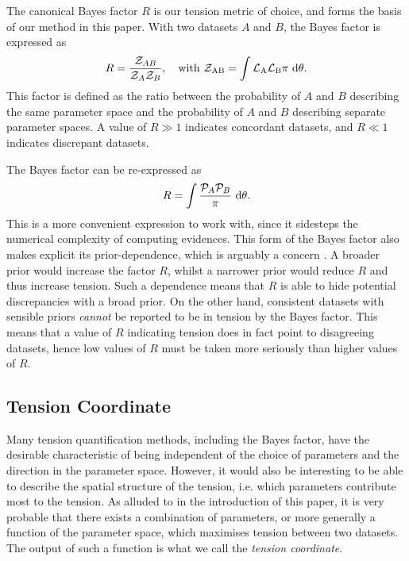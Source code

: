 \documentclass[%
 reprint,
 amsmath,amssymb,
 aps,
]{revtex4-2}
\begin{document}
The canonical Bayes factor $R$ \cite{Marshall2006} is our tension metric of choice, and forms the basis of our method in this paper. With two datasets $A$ and $B$, the Bayes factor is expressed as
\begin{equation}
    R = \frac{\mathcal{Z}_{AB}}{\mathcal{Z}_A \mathcal{Z}_B}, \quad \rm{with} \ \mathcal{Z}_{AB} = \int \mathcal{L}_A \mathcal{L}_B \pi \ \rm{d}\theta.
\end{equation}
This factor is defined as the ratio between the probability of $A$ and $B$ describing the same parameter space and the probability of $A$ and $B$ describing separate parameter spaces. A value of $R \gg 1$ indicates concordant datasets, and $R \ll 1$ indicates discrepant datasets.

The Bayes factor can be re-expressed as 
\begin{equation}
    R = \int \frac{\mathcal{P}_A \mathcal{P}_B}{\pi} \ \rm{d}\theta.
\end{equation}
This is a more convenient expression to work with, since it sidesteps the numerical complexity of computing evidences. This form of the Bayes factor also makes explicit its prior-dependence, which is arguably a concern \cite{Handley2019}. A broader prior would increase the factor $R$, whilst a narrower prior would reduce $R$ and thus increase tension. Such a dependence means that $R$ is able to hide potential discrepancies with a broad prior. On the other hand, consistent datasets with sensible priors \textit{cannot} be reported to be in tension by the Bayes factor. This means that a value of $R$ indicating tension does in fact point to disagreeing datasets, hence low values of $R$ must be taken more seriously than higher values of $R$.


\subsection{Tension Coordinate}

Many tension quantification methods, including the Bayes factor, have the desirable characteristic of being independent of the choice of parameters and the direction in the parameter space. However, it would also be interesting to be able to describe the spatial structure of the tension, i.e. which parameters contribute most to the tension. As alluded to in the introduction of this paper, it is very probable that there exists a combination of parameters, or more generally a function of the parameter space, which maximises tension between two datasets. The output of such a function is what we call the \textit{tension coordinate}. 
\end{document}
